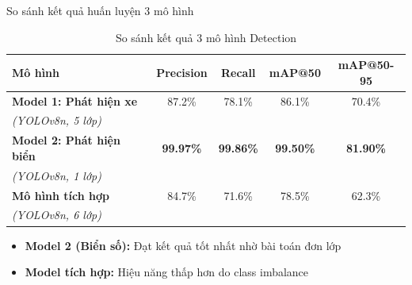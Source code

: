 \begin{frame}{So sánh kết quả huấn luyện 3 mô hình}
    \begin{table}
        \centering
        \small
        \begin{tabular}{|l|c|c|c|c|}
            \hline
            \textbf{Mô hình} & \textbf{Precision} & \textbf{Recall} & \textbf{mAP@50} & \textbf{mAP@50-95} \\
            \hline
            \textbf{Model 1: Phát hiện xe} & 87.2\% & 78.1\% & 86.1\% & 70.4\% \\
            \textit{(YOLOv8n, 5 lớp)} & & & & \\
            \hline
            \textbf{Model 2: Phát hiện biển} & \textbf{99.97\%} & \textbf{99.86\%} & \textbf{99.50\%} & \textbf{81.90\%} \\
            \textit{(YOLOv8n, 1 lớp)} & & & & \\
            \hline
            \textbf{Mô hình tích hợp} & 84.7\% & 71.6\% & 78.5\% & 62.3\% \\
            \textit{(YOLOv8n, 6 lớp)} & & & & \\
            \hline
        \end{tabular}
        \caption{So sánh kết quả 3 mô hình Detection}
    \end{table}

    \begin{itemize}
        \item \textbf{Model 2 (Biển số):} Đạt kết quả tốt nhất nhờ bài toán đơn lớp
        \item \textbf{Model tích hợp:} Hiệu năng thấp hơn do class imbalance
    \end{itemize}
\end{frame}

